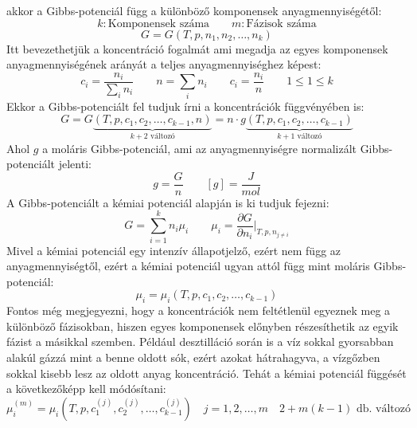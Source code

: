 \documentclass[../main.tex]{subfiles}
\begin{document}
akkor a Gibbs-potenciál függ a különböző komponensek anyagmennyiségétől:
\begin{equation}
    k: \text{Komponensek száma} \qquad m: \text{Fázisok száma}
\end{equation}
\begin{equation}
    G = G(T, p, n_1, n_2, \ldots, n_k)
\end{equation}
Itt bevezethetjük a koncentráció fogalmát ami megadja az egyes komponensek anyagmennyiségének arányát a teljes anyagmennyiséghez képest:
\begin{equation}
    c_i = \frac{n_i}{\sum_i n_i} \qquad n = \sum_i n_i \qquad c_i = \frac{n_i}{n} \qquad 1 \leq 1 \leq k
\end{equation}
Ekkor a Gibbs-potenciált fel tudjuk írni a koncentrációk függvényében is:
\begin{equation}
    G = G \underbrace{(T, p, c_1, c_2, \ldots, c_{k-1}, n)}_{k + 2 \text{ változó}} = n \cdot g \underbrace{(T, p, c_1, c_2, \ldots, c_{k-1})}_{k + 1 \text{ változó}}
\end{equation}
Ahol $g$ a moláris Gibbs-potenciál, ami az anyagmennyiségre normalizált Gibbs-potenciált jelenti:
\begin{equation}
    g = \frac{G}{n} \qquad \left[g\right] = \frac{J}{mol}
\end{equation}
A Gibbs-potenciált a kémiai potenciál alapján is ki tudjuk fejezni:
\begin{equation}
    G = \sum_{i=1}^{k} n_i \mu_i \qquad \mu_i = \frac{\partial G}{\partial n_i}\bigg|_{T, p, n_{j \neq i}}
\end{equation}
Mivel a kémiai potenciál egy intenzív állapotjelző, ezért nem függ az anyagmennyiségtől, ezért a kémiai potenciál ugyan attól függ mint moláris Gibbs-potenciál:
\begin{equation}
    \mu_i = \mu_i (T, p, c_1, c_2, \ldots, c_{k-1})
\end{equation}
Fontos még megjegyezni, hogy a koncentrációk nem feltétlenül egyeznek meg a különböző fázisokban, hiszen egyes komponensek előnyben részesíthetik az egyik fázist a másikkal szemben.
Például desztilláció során is a víz sokkal gyorsabban alakúl gázzá mint a benne oldott sók, ezért azokat hátrahagyva, a vízgőzben sokkal kisebb lesz az oldott anyag koncentráció.
Tehát a kémiai potenciál függését a következőképp kell módósítani:
\begin{equation}
    \mu_i^{(m)} = \mu_i (T, p, c_1^{(j)}, c_2^{(j)}, \ldots, c_{k-1}^{(j)}) \quad j = 1, 2, \ldots, m \quad 2 + m(k - 1) \text{ db. változó}
\end{equation}
\end{document}
